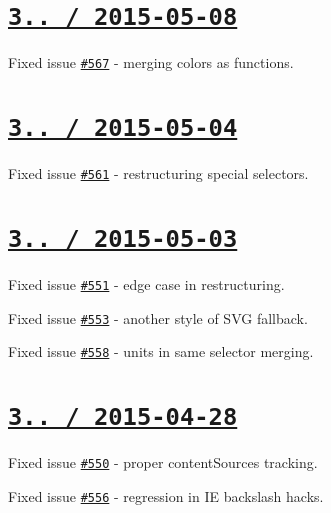 \section*{\href{https://github.com/jakubpawlowicz/clean-css/compare/v3.2.8...v3.2.9}{\tt 3.. / 2015-\/05-\/08} }


\begin{DoxyItemize}
\item Fixed issue \href{https://github.com/jakubpawlowicz/clean-css/issues/567}{\tt \#567} -\/ merging colors as functions.
\end{DoxyItemize}

\section*{\href{https://github.com/jakubpawlowicz/clean-css/compare/v3.2.7...v3.2.8}{\tt 3.. / 2015-\/05-\/04} }


\begin{DoxyItemize}
\item Fixed issue \href{https://github.com/jakubpawlowicz/clean-css/issues/561}{\tt \#561} -\/ restructuring special selectors.
\end{DoxyItemize}

\section*{\href{https://github.com/jakubpawlowicz/clean-css/compare/v3.2.6...v3.2.7}{\tt 3.. / 2015-\/05-\/03} }


\begin{DoxyItemize}
\item Fixed issue \href{https://github.com/jakubpawlowicz/clean-css/issues/551}{\tt \#551} -\/ edge case in restructuring.
\item Fixed issue \href{https://github.com/jakubpawlowicz/clean-css/issues/553}{\tt \#553} -\/ another style of S\+VG fallback.
\item Fixed issue \href{https://github.com/jakubpawlowicz/clean-css/issues/558}{\tt \#558} -\/ units in same selector merging.
\end{DoxyItemize}

\section*{\href{https://github.com/jakubpawlowicz/clean-css/compare/v3.2.5...v3.2.6}{\tt 3.. / 2015-\/04-\/28} }


\begin{DoxyItemize}
\item Fixed issue \href{https://github.com/jakubpawlowicz/clean-css/issues/550}{\tt \#550} -\/ proper {\ttfamily content\+Sources} tracking.
\item Fixed issue \href{https://github.com/jakubpawlowicz/clean-css/issues/556}{\tt \#556} -\/ regression in IE backslash hacks.
\end{DoxyItemize}

